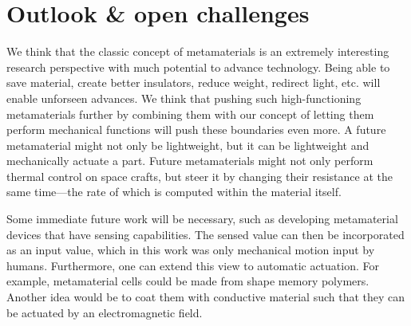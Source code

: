 


\section{Outlook \& open challenges}

We think that the classic concept of metamaterials is an extremely interesting research perspective with much potential to advance technology. Being able to save material, create better insulators, reduce weight, redirect light, etc. will enable unforseen advances. We think that pushing such high-functioning metamaterials further by combining them with our concept of letting them perform mechanical functions will push these boundaries even more. A future metamaterial might not only be lightweight, but it can be lightweight and mechanically actuate a part. Future metamaterials might not only perform thermal control on space crafts, but steer it by changing their resistance at the same time---the rate of which is computed within the material itself.

Some immediate future work will be necessary, such as developing metamaterial devices that have sensing capabilities. The sensed value can then be incorporated as an input value, which in this work was only mechanical motion input by humans. Furthermore, one can extend this view to automatic actuation. For example, metamaterial cells could be made from shape memory polymers. Another idea would be to coat them with conductive material such that they can be actuated by an electromagnetic field.  

